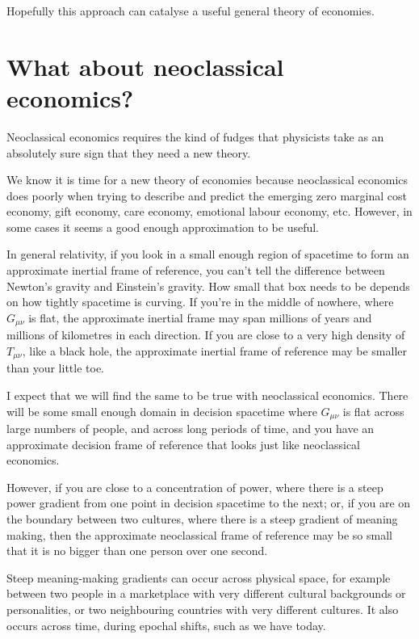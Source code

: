 Hopefully this approach can catalyse a useful general theory of economies. 


\section*{What about neoclassical economics?}
Neoclassical economics requires the kind of fudges that physicists take as an absolutely sure sign that they need a new theory. 


We know it is time for a new theory of economies because neoclassical economics does poorly when trying to describe and predict the emerging zero marginal cost economy, gift economy, care economy, emotional labour economy, etc. However, in some cases it seems a good enough approximation to be useful.


In general relativity, if you look in a small enough region of spacetime to form an approximate inertial frame of reference, you can't tell the difference between Newton's gravity and Einstein's gravity. How small that box needs to be depends on how tightly spacetime is curving. If you're in the middle of nowhere, where $G_{\mu\nu}$ is flat, the approximate inertial frame may span millions of years and millions of kilometres in each direction. If you are close to a very high density of $T_{\mu\nu}$, like a black hole,  the approximate inertial frame of reference may be smaller than your little toe.


I expect that we will find the same to be true with neoclassical economics. There will be some small enough domain in decision spacetime where $G_{\mu\nu}$ is flat across large numbers of people, and across long periods of time, and you have an approximate decision frame of reference that looks just like neoclassical economics.


However, if you are close to a concentration of power, where there is a steep power gradient from one point in decision spacetime to the next; or, if you are on the boundary between two cultures, where there is a steep gradient of meaning making, then the approximate neoclassical frame of reference may be so small that it is no bigger than one person over one second.


Steep meaning\hyp{}making gradients can occur across physical space, for example between two people in a marketplace with very different cultural backgrounds or personalities, or two neighbouring countries with very different cultures. It also occurs across time, during epochal shifts, such as we have today.


